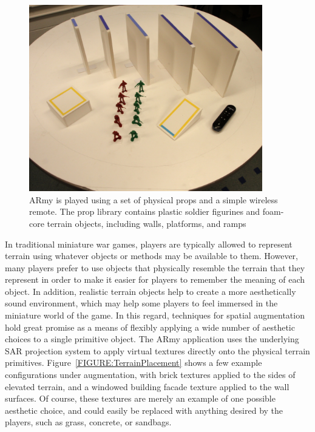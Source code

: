 \documentclass{thesis}
\begin{document}
\begin{figure}[t]
\begin{center}
\includegraphics[width=4in]{images/props.jpg}
\end{center}
\vspace{-0.1in}
\caption[ARmy Primitives]{ARmy is played using a set of physical props and a simple wireless remote. The prop library contains plastic soldier figurines and foam-core terrain objects, including walls, platforms, and ramps}
\label{FIGURE:GamePrimitives}
\end{figure}

In traditional miniature war games, players are typically allowed to represent terrain using whatever objects or methods may be available to them. However, many players prefer to use objects that physically resemble the terrain that they represent in order to make it easier for players to remember the meaning of each object. In addition, realistic terrain objects help to create a more aesthetically sound environment, which may help some players to feel immersed in the miniature world of the game. In this regard, techniques for spatial augmentation hold great promise as a means of flexibly applying a wide number of aesthetic choices to a single primitive object. The ARmy application uses the underlying SAR projection system to apply virtual textures directly onto the physical terrain primitives.  Figure~\ref{FIGURE:TerrainPlacement} shows a few example configurations under augmentation, with brick textures applied to the sides of elevated terrain, and a windowed building facade texture applied to the wall surfaces. Of course, these textures are merely an example of one possible aesthetic choice, and could easily be replaced with anything desired by the players, such as grass, concrete, or sandbags.
\end{document}
